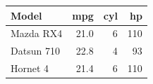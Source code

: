 
\begin{tabular}{l|r|r|r}
\hline
Model & mpg & cyl & hp\\
\hline
Mazda RX4 & 21.0 & 6 & 110\\
\hline
Datsun 710 & 22.8 & 4 & 93\\
\hline
Hornet 4 & 21.4 & 6 & 110\\
\hline
\end{tabular}
